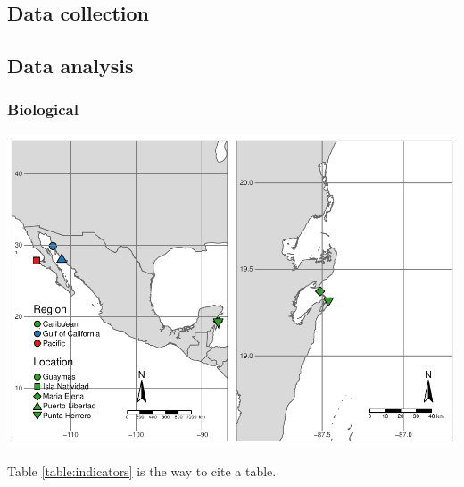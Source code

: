 \documentclass{frontiersSCNS}
\begin{document}
\subsection{Data collection}\label{data-collection}

\subsection{Data analysis}\label{data-analysis}

\subsubsection{Biological}\label{biological}

\includegraphics{Villasenor-Derbez_files/figure-latex/unnamed-chunk-2-1.pdf}

Table \ref{table:indicators} is the way to cite a table.
\end{document}
